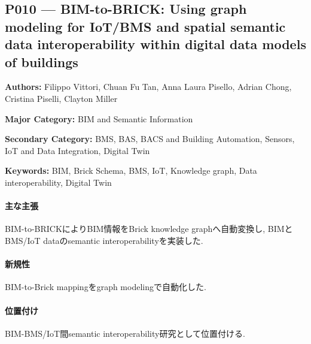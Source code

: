 \subsection{P010 --- BIM-to-BRICK: Using graph modeling for IoT/BMS and spatial semantic data interoperability within digital data models of buildings}
\label{paper:P010}
\textbf{Authors:} Filippo Vittori, Chuan Fu Tan, Anna Laura Pisello, Adrian Chong, Cristina Piselli, Clayton Miller\par
\textbf{Major Category:} BIM and Semantic Information\par
\textbf{Secondary Category:} BMS, BAS, BACS and Building Automation, Sensors, IoT and Data Integration, Digital Twin\par
\textbf{Keywords:} BIM, Brick Schema, BMS, IoT, Knowledge graph, Data interoperability, Digital Twin\par
\paragraph{主な主張}
BIM-to-BRICKによりBIM情報をBrick knowledge graphへ自動変換し, BIMとBMS/IoT dataのsemantic interoperabilityを実装した. \cite{Vittori:2025BIMtoBRICK}
\paragraph{新規性}
BIM-to-Brick mappingをgraph modelingで自動化した.
\paragraph{位置付け}
BIM-BMS/IoT間semantic interoperability研究として位置付ける.

